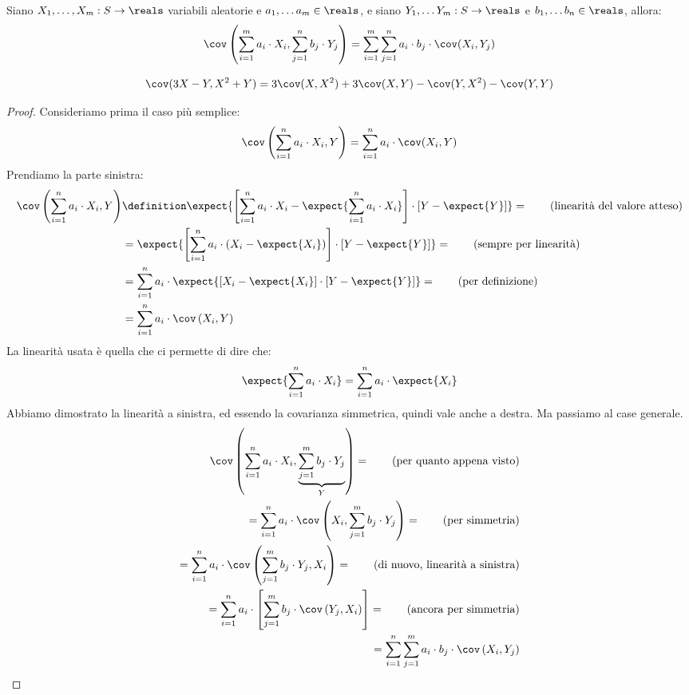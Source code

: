 \begin{prop}
Siano $X_1, \ldots, X_m : S \to \reals$ variabili aleatorie e $a_1, \ldots a_m \in \reals$, e siano $Y_1, \ldots Y_m : S \to \reals$ e $b_1, \ldots b_n \in \reals$, allora:
\[
\cov \left( \sum_{i = 1}^{m} a_i \cdot X_i, \sum_{j = 1}^{n} b_j \cdot Y_j \right) = 
\sum_{i = 1}^{m} \sum_{j = 1}^{n} a_i \cdot b_j \cdot \cov (X_i, Y_j)
\]
\end{prop}

\begin{exmp}
\[
\cov (3X - Y, X^2 + Y) = 3 \cov (X, X^2) + 3 \cov (X,Y) - \cov (Y, X^2) - \cov (Y,Y)
\]
\end{exmp}

\begin{proof}
Consideriamo prima il caso pi\`u semplice:
\[
\cov \left( \sum_{i = 1}^{n} a_i \cdot X_i, Y \right) = \sum_{i = 1}^{n} a_i \cdot \cov(X_i, Y)
\]
Prendiamo la parte sinistra:
\begin{align*}
\cov \left( \sum_{i = 1}^{n} a_i \cdot X_i, Y \right) &\definition \expect{ \left[ \sum_{i = 1}^{n} a_i \cdot X_i - \expect{ \sum_{i = 1}^{n} a_i \cdot X_i} \right] \cdot \left[ Y - \expect{Y} \right]} = \tag{linearit\`a del valore atteso} \\
&= \expect{ \left[ \sum_{i = 1}^{n} a_i \cdot \left( X_i - \expect{X_i} \right) \right] \cdot \left[ Y - \expect{Y} \right] } = \tag{sempre per linearit\`a} \\
&= \sum_{i = 1}^{n} a_i \cdot \expect{ \left[ X_i - \expect{X_i} \right] \cdot \left[ Y - \expect{Y} \right] } = \tag{per definizione} \\
&= \sum_{i = 1}^{n} a_i \cdot \cov \left( X_i, Y \right)
\end{align*}
La linearit\`a usata \`e quella che ci permette di dire che:
\[
\expect{\sum_{i = 1}^{n} a_i \cdot X_i} = \sum_{i=1}^{n} a_i \cdot \expect{X_i}
\]
Abbiamo dimostrato la linearit\`a a sinistra, ed essendo la covarianza simmetrica, quindi vale anche a destra. Ma passiamo al case generale.
\begin{align*}
\cov \left( \sum_{i = 1}^{n} a_i \cdot X_i, \underbrace{\sum_{j = 1}^{m} b_j \cdot Y_j}_Y \right) = \tag{per quanto appena visto} \\
= \sum_{i = 1}^{n} a_i \cdot \cov \left( X_i, \sum_{j = 1}^{m} b_j \cdot Y_j \right) = \tag{per simmetria} \\
= \sum_{i = 1}^{n} a_i \cdot \cov \left( \sum_{j = 1}^{m} b_j \cdot Y_j, X_i \right) = \tag{di nuovo, linearit\`a a sinistra} \\
= \sum_{i = 1}^{n} a_i \cdot \left[ \sum_{j = 1}^{m} b_j \cdot \cov \left( Y_j, X_i \right) \right] = \tag{ancora per simmetria} \\
= \sum_{i = 1}^{n} \sum_{j = 1}^{m} a_i \cdot b_j \cdot \cov \left( X_i, Y_j \right)
\end{align*}
\end{proof}

